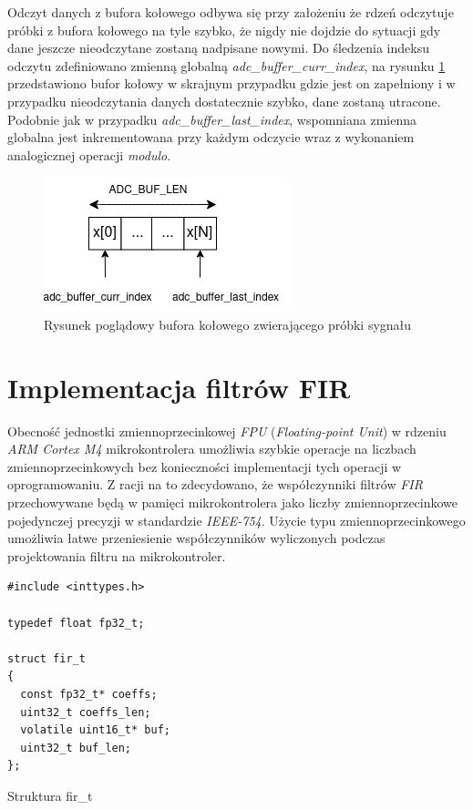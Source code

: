 Odczyt danych z bufora kołowego odbywa się przy założeniu że rdzeń odczytuje próbki z bufora kołowego na tyle szybko,
że nigdy nie dojdzie do sytuacji gdy dane jeszcze nieodczytane zostaną nadpisane nowymi. Do śledzenia indeksu odczytu
zdefiniowano zmienną globalną \textit{adc\_buffer\_curr\_index}, na rysunku \ref{fig:rbuffer} przedstawiono bufor
kołowy w skrajnym przypadku gdzie jest on zapełniony i w przypadku nieodczytania danych dostatecznie szybko, dane zostaną utracone.
Podobnie jak w przypadku \textit{adc\_buffer\_last\_index}, wspomniana zmienna globalna jest inkrementowana przy każdym odczycie
wraz z wykonaniem analogicznej operacji \textit{modulo}.

\begin{figure}[h!]
    \centering 
    \includegraphics[scale=0.7]{pl/media/rbuffer.png}
    \caption{Rysunek poglądowy bufora kołowego zwierającego próbki sygnału}
    \label{fig:rbuffer}
\end{figure}

\newpage
\section{Implementacja filtrów FIR}

Obecność jednostki zmiennoprzecinkowej \textit{FPU} (\textit{Floating-point Unit}) w rdzeniu \textit{ARM Cortex M4} 
mikrokontrolera umożliwia szybkie operacje na liczbach zmiennoprzecinkowych bez konieczności implementacji tych operacji 
w oprogramowaniu. Z racji na to zdecydowano, że współczynniki filtrów \textit{FIR} przechowywane będą w pamięci 
mikrokontrolera jako liczby zmiennoprzecinkowe pojedynczej precyzji w standardzie \textit{IEEE-754}. Użycie typu
zmiennoprzecinkowego umożliwia łatwe przeniesienie współczynników wyliczonych podczas projektowania filtru na mikrokontroler.

\begin{listing}
\begin{verbatim}
#include <inttypes.h>

typedef float fp32_t;

struct fir_t
{
  const fp32_t* coeffs;
  uint32_t coeffs_len;
  volatile uint16_t* buf;
  uint32_t buf_len; 
};
\end{verbatim} 
\caption{Struktura fir\_t}
\label{listing:firt}
\end{listing}

